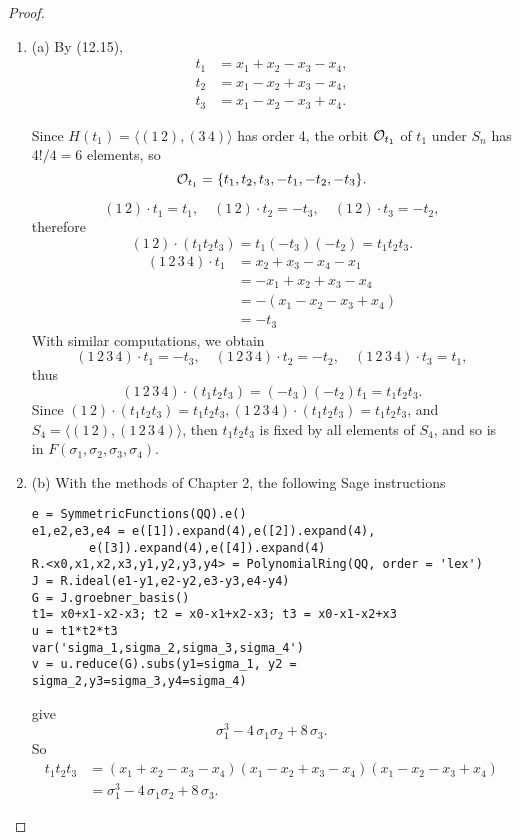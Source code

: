 \documentclass[11pt,a4paper]{article}
\newcommand{\be} {\begin{enumerate}}
\newcommand{\ee} {\end{enumerate}}
\begin{document}
\begin{proof}
\be
\item[(a)] By (12.15),
\begin{align*}
t_1 &= x_1+x_2-x_3-x_4,\\
t_2 &= x_1-x_2+x_3-x_4,\\
t_3 &= x_1-x_2-x_3+x_4.
\end{align*}

Since $H(t_1) = \langle (1\,2),(3\,4) \rangle$ has order 4, the orbit ${\cal O}_{t_1}$ of $t_1$ under $S_n$ has $4!/4 = 6$ elements, so $${\cal O}_{t_1} =  \{t_1,t_2,t_3,-t_1,-t_2,-t_3\}.$$

$$(1 \,2) \cdot t_1 = t_1, \quad (1 \,2) \cdot t_2 = -t_3, \quad (1 \,2) \cdot t_3 = -t_2,$$
therefore 
$$(1 \,2) \cdot (t_1t_2t_3) = t_1(-t_3)(-t_2) = t_1t_2t_3.$$
\begin{align*}
(1 \,2 \, 3 \, 4) \cdot t_1 &= x_2+x_3-x_4-x_1\\
&=-x_1+x_2+x_3-x_4\\
&=-(x_1-x_2-x_3+x_4)\\
&=-t_3
\end{align*}
With similar computations, we obtain
$$(1 \,2 \, 3 \, 4) \cdot t_1 = -t_3, \quad (1 \,2 \, 3 \, 4)\cdot t_2 = -t_2, \quad (1 \,2 \, 3 \, 4)\cdot t_3 = t_1,$$
thus
$$ (1 \,2 \, 3 \, 4) \cdot (t_1t_2t_3) = (-t_3)(-t_2)t_1 = t_1t_2t_3.$$
Since $(1 \,2) \cdot (t_1t_2t_3)  = t_1t_2t_3, (1 \,2 \, 3 \, 4) \cdot (t_1t_2t_3) = t_1t_2t_3$, and $S_4 = \langle (1 \,2), (1 \,2 \, 3 \, 4) \rangle$, then $t_1t_2t_3$ is fixed by all elements of $S_4$, and so is in $F(\sigma_1,\sigma_2,\sigma_3,\sigma_4)$.

\item[(b)] With the methods of Chapter 2, the following Sage instructions
\begin{verbatim}
e = SymmetricFunctions(QQ).e()
e1,e2,e3,e4 = e([1]).expand(4),e([2]).expand(4),
        e([3]).expand(4),e([4]).expand(4)
R.<x0,x1,x2,x3,y1,y2,y3,y4> = PolynomialRing(QQ, order = 'lex')
J = R.ideal(e1-y1,e2-y2,e3-y3,e4-y4)
G = J.groebner_basis()
t1= x0+x1-x2-x3; t2 = x0-x1+x2-x3; t3 = x0-x1-x2+x3
u = t1*t2*t3
var('sigma_1,sigma_2,sigma_3,sigma_4')
v = u.reduce(G).subs(y1=sigma_1, y2 = sigma_2,y3=sigma_3,y4=sigma_4)
\end{verbatim}
give
$$\sigma_{1}^{3} - 4 \, \sigma_{1} \sigma_{2} + 8 \, \sigma_{3}.
$$
So
\begin{align*}
t_1t_2t_3 &= (x_1+x_2-x_3-x_4)(x_1-x_2+x_3-x_4)( x_1-x_2-x_3+x_4)\\
& = \sigma_{1}^{3} - 4 \, \sigma_{1} \sigma_{2} + 8 \, \sigma_{3}.
\end{align*}
\ee
\end{proof}
\end{document}
